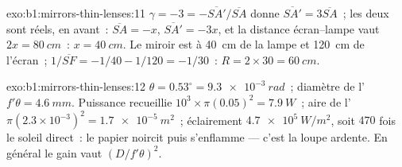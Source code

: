\begin{solution}{exo:b1:mirrors-thin-lenses:11}
$\gamma = -3 = -\overline{SA'}/\overline{SA}$ donne $\overline{SA'} =
3\overline{SA}$~; les deux sont réels, en avant~: $\overline{SA} = -x$,
$\overline{SA'} = -3x$, et la distance écran--lampe vaut $2x = \qty{80}{cm}$~:
$x = \qty{40}{cm}$. Le miroir est à \qty{40}{cm} de la lampe et \qty{120}{cm}
de l'écran~; $1/\overline{SF} = -1/40 - 1/120 = -1/30$~:
$R = 2 \times 30 = \qty{60}{cm}$.
\end{solution}

\begin{solution}{exo:b1:mirrors-thin-lenses:12}
$\theta = 0.53^\circ = \qty{9.3e-3}{rad}$~; diamètre de l' $f'\theta =
\qty{4.6}{mm}$. Puissance recueillie $10^3 \times \pi(0.05)^2 = \qty{7.9}{W}$~;
aire de l' $\pi(2.3\times10^{-3})^2 = \qty{1.7e-5}{m^2}$~; éclairement
$\qty{4.7e5}{W/m^2}$, soit $470$ fois le soleil direct~: le papier
noircit puis s'enflamme --- c'est la loupe ardente. En général le gain
vaut $(D/f'\theta)^2$.
\end{solution}

